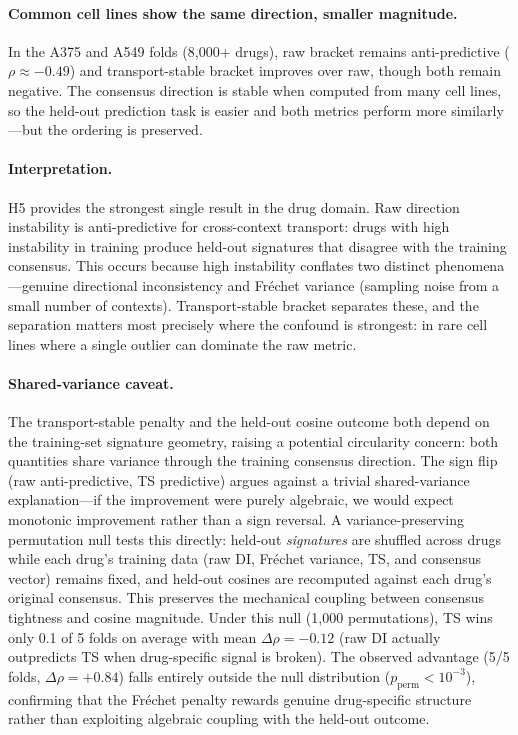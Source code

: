 \documentclass{article}
\begin{document}
\paragraph{Common cell lines show the same direction, smaller magnitude.}
In the A375 and A549 folds (8{,}000+ drugs), raw bracket remains
anti-predictive ($\rho \approx -0.49$) and transport-stable bracket
improves over raw, though both remain negative. The consensus direction
is stable when computed from many cell lines, so the held-out prediction
task is easier and both metrics perform more similarly---but the ordering
is preserved.

\paragraph{Interpretation.}
H5 provides the strongest single result in the drug domain. Raw direction
instability is anti-predictive for cross-context transport: drugs with high
instability in training produce held-out signatures that disagree with the
training consensus. This occurs because high instability conflates two
distinct phenomena---genuine directional inconsistency and Fr\'{e}chet
variance (sampling noise from a small number of contexts). Transport-stable
bracket separates these, and the separation matters most precisely where the
confound is strongest: in rare cell lines where a single outlier can
dominate the raw metric.

\paragraph{Shared-variance caveat.}
The transport-stable penalty and the held-out cosine outcome both depend on
the training-set signature geometry, raising a potential circularity concern:
both quantities share variance through the training consensus direction.
The sign flip (raw anti-predictive, TS predictive) argues against a trivial
shared-variance explanation---if the improvement were purely algebraic,
we would expect monotonic improvement rather than a sign reversal. A
variance-preserving permutation null tests this directly: held-out
\emph{signatures} are shuffled across drugs while each drug's training
data (raw DI, Fr\'echet variance, TS, and consensus vector) remains
fixed, and held-out cosines are recomputed against each drug's original
consensus. This preserves the mechanical coupling between consensus
tightness and cosine magnitude. Under this null (1{,}000 permutations),
TS wins only 0.1 of 5 folds on average with mean $\Delta\rho = -0.12$
(raw DI actually outpredicts TS when drug-specific signal is broken).
The observed advantage (5/5 folds, $\Delta\rho = +0.84$) falls entirely
outside the null distribution ($p_{\text{perm}} < 10^{-3}$), confirming
that the Fr\'echet penalty rewards genuine drug-specific structure rather
than exploiting algebraic coupling with the held-out outcome.
\end{document}
